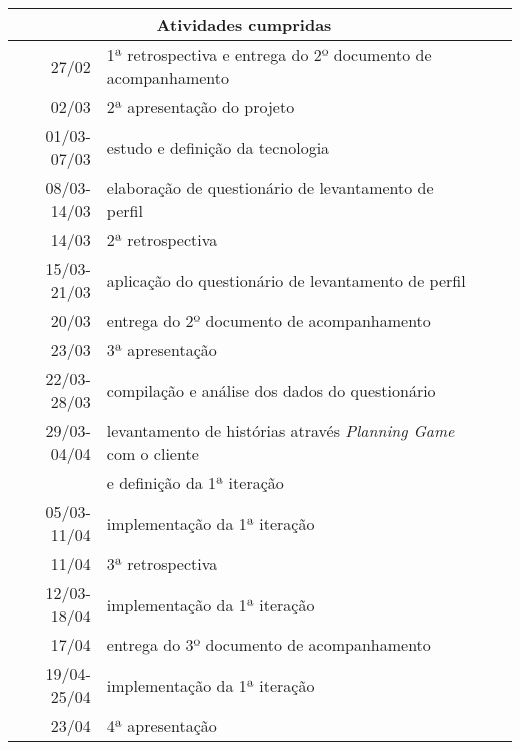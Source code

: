 \documentclass[a4paper,12pt,font=plain,header=plain]{abnt}
\begin{document}
	\begin{tabularx}{0.9\linewidth}[|l|]{ |r|X|l|X| }
	\hline
		\multicolumn{2}{|c|}{\textbf{Atividades cumpridas}} \\
	\hline
		27/02 & 1ª retrospectiva e entrega do 2º documento de acompanhamento \\
	\hline
		02/03 & 2ª apresentação do projeto \\
	\hline
		01/03-07/03 & estudo e definição da tecnologia \\
	\hline
		08/03-14/03 & elaboração de questionário de levantamento de perfil \\
	\hline
		14/03 & 2ª retrospectiva \\
	\hline
		15/03-21/03 & aplicação do questionário de levantamento de perfil \\
	\hline
		20/03 & entrega do 2º documento de acompanhamento \\
	\hline
		23/03 & 3ª apresentação \\
	\hline
		22/03-28/03 & compilação e análise dos dados do questionário \\
	\hline
		29/03-04/04 & levantamento de histórias através \textit{Planning Game} com o cliente \\
			    & e definição da 1ª iteração \\
	\hline
		05/03-11/04 & implementação da 1ª iteração \\
	\hline
		11/04 & 3ª retrospectiva \\
	\hline
		12/03-18/04 & implementação da 1ª iteração \\
	\hline
		17/04 & entrega do 3º documento de acompanhamento \\
	\hline
		19/04-25/04 & implementação da 1ª iteração \\
	\hline
		23/04 & 4ª apresentação \\
	\hline
	\end{tabularx} \\
\end{document}
